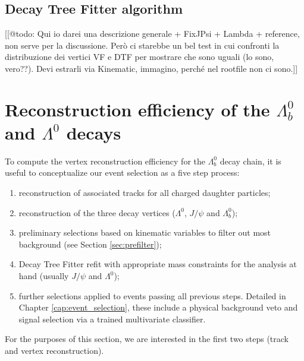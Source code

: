 \subsection{Decay Tree Fitter algorithm}
[[@todo: Qui io darei una descrizione generale + FixJPsi + Lambda + reference, non serve per la discussione. Però ci starebbe un bel test in cui confronti la distribuzione dei vertici VF e DTF per mostrare che sono uguali (lo sono, vero??). Devi estrarli via Kinematic, immagino, perché nel rootfile non ci sono.]]


\section{Reconstruction efficiency of the \texorpdfstring{$\Lambda^0_b$}{Lambdab} and \texorpdfstring{$\Lambda^0$}{Lambda} decays}

To compute the vertex reconstruction efficiency for the $\Lambda_b^0$ decay chain, it is useful to conceptualize our event selection as a five step process:
\begin{enumerate}
	\item reconstruction of associated tracks for all charged daughter particles;
	\item reconstruction of the three decay vertices ($\Lambda^0$, $J/\psi$ and $\Lambda_b^0$);
	\item preliminary selections based on kinematic variables to filter out most background (see Section \ref{sec:prefilter});
	\item Decay Tree Fitter refit with appropriate mass constraints for the analysis at hand (usually $J/\psi$ and $\Lambda^0$);
	\item further selections applied to events passing all previous steps. Detailed in Chapter \ref{cap:event_selection}, these include a physical background veto and signal selection via a trained multivariate classifier.
\end{enumerate}

For the purposes of this section, we are interested in the first two steps (track and vertex reconstruction).


